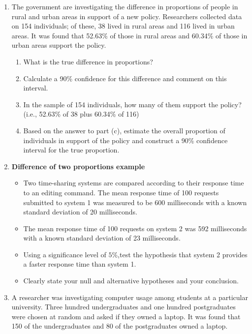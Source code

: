 \documentclass[]{report}
\begin{document}
\begin{enumerate}
\begin{enumerate}
\item 
The government are investigating the difference in proportions of people in rural and urban areas in support of a new policy. Researchers collected data on 154 individuals; of these, 38 lived in rural areas and 116 lived in urban areas. It was found that 52.63\% of those in rural areas and 60.34\% of those in urban areas support the policy.\\[-0.2cm]
\begin{enumerate}
\item What is the true difference in proportions?  \item Calculate a 90\% confidence for this difference and comment on this interval.  \item In the sample of 154 individuals, how many of them support the policy? (i.e., 52.63\% of 38 plus 60.34\% of 116)  \item Based on the answer to part (c), estimate the overall proportion of individuals in support of the policy and construct a 90\% confidence interval for the true proportion.
\end{enumerate}


\item
\textbf{Difference of two proportions example}
\begin{itemize}
\item Two time-sharing systems are compared according to their response time to an editing command. The mean response time of 100 requests submitted to system 1 was measured to be 600 milliseconds with a
known standard deviation of 20 milliseconds. 
\item The mean response time
of 100 requests on system 2 was 592 milliseconds with a known standard deviation of 23 milliseconds. 
\item Using a significance level of $5\%$,test the hypothesis that system 2 provides a faster response time than
system 1. 
\item Clearly state your null and alternative hypotheses and your conclusion.
\end{itemize}

\item A researcher was investigating computer usage among students at a particular university. Three hundred undergraduates and one hundred postgraduates were chosen at random and asked if they owned a laptop. It was found that 150 of
the undergraduates and 80 of the postgraduates owned a laptop.


\end{enumerate}
\end{enumerate}
\end{document}
